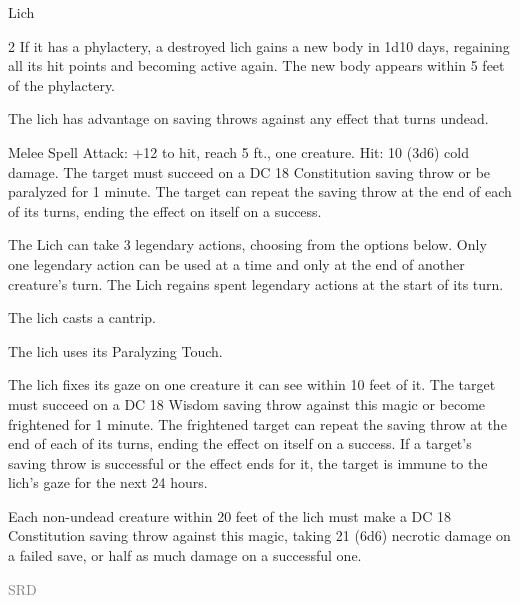 \documentclass[letterpaper, 11pt, bg=full, twocolumn, stats=modern]{dndbook}
\begin{document}
\begin{DndMonster}[float*=tp,width=\textwidth + 8pt, toptitle=0pt, top=1pt]{Lich}
\begin{multicols}{2}
If it has a phylactery, a destroyed lich gains a new body in 1d10 days, regaining all its hit points and becoming active again. The new body appears within 5 feet of the phylactery.

The lich has advantage on saving throws against any effect that turns undead.

Melee Spell Attack: +12 to hit, reach 5 ft., one creature. Hit: 10 (3d6) cold damage. The target must succeed on a DC 18 Constitution saving throw or be paralyzed for 1 minute. The target can repeat the saving throw at the end of each of its turns, ending the effect on itself on a success.

The Lich can take 3 legendary actions, choosing from the options below. Only one legendary action can be used at a time and only at the end of another creature's turn. The Lich regains spent legendary actions at the start of its turn.

The lich casts a cantrip.

The lich uses its Paralyzing Touch.

The lich fixes its gaze on one creature it can see within 10 feet of it. The target must succeed on a DC 18 Wisdom saving throw against this magic or become frightened for 1 minute. The frightened target can repeat the saving throw at the end of each of its turns, ending the effect on itself on a success. If a target's saving throw is successful or the effect ends for it, the target is immune to the lich's gaze for the next 24 hours.

Each non-undead creature within 20 feet of the lich must make a DC 18 Constitution saving throw against this magic, taking 21 (6d6) necrotic damage on a failed save, or half as much damage on a successful one.

\vspace{2pt}
\noindent\hfill{\scriptsize\textcolor{gray}{SRD}}

\endgroup
\end{multicols}
\end{DndMonster}

\FloatBarrier
\end{document}
